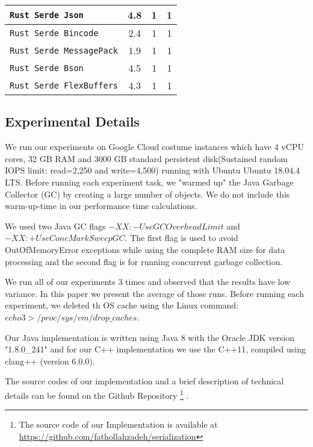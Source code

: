 \begin{table}
\begin{adjustbox}{width=\columnwidth,center}
\begin{tabular}{|l|c|c|c|}
			\texttt{Rust Serde Json}  & 4.8 & 1 & 1 \\ \hline
			\texttt{Rust Serde Bincode}  & 2.4 & 1 & 1\\ \hline			
			\texttt{Rust Serde MessagePack}  & 1.9 & 1 & 1 \\ \hline			
			\texttt{Rust Serde Bson}  & 4.5 & 1 & 1 \\ \hline			
			\texttt{Rust Serde FlexBuffers}  & 4.3 & 1 & 1 \\ 						
			\hline\end{tabular}
	\end{adjustbox}
\end{table}



\subsection{Experimental Details}
We run our experiments on Google Cloud costume instances which have 4 vCPU cores, 32 GB RAM and 3000 GB standard persistent disk(Sustained random IOPS limit: read=2,250 and write=4,500) running with Ubuntu Ubuntu 18.04.4 LTS. Before running each experiment task, we "warmed up" the Java Garbage Collector (GC) by creating a large number of objects. We do not include this warm-up-time in our performance time calculations.

We used two Java GC flags $-XX:-UseGCOverheadLimit$ and $-XX:+UseConcMarkSweepGC$. The first flag is used to avoid OutOfMemoryError exceptions while using the complete RAM size for data processing and the second flag is for running concurrent garbage collection.

We run all of our experiments 3 times and observed that the results have low variance. In this paper we present the average of those runs. Before running each experiment, we deleted th OS cache using the Linux command: $echo 3 > /proc/sys/vm/drop\_caches$.

Our Java implementation is written using Java 8 with the Oracle JDK version "1.8.0\_241" and for our C++ implementation we use the C++11, compiled using clang++ (version 6.0.0).

The source codes of our implementation and a brief description of technical details can be found on the Github Repository \footnote{The source code of our Implementation is available at \url{https://github.com/fathollahzadeh/serialization}} .
